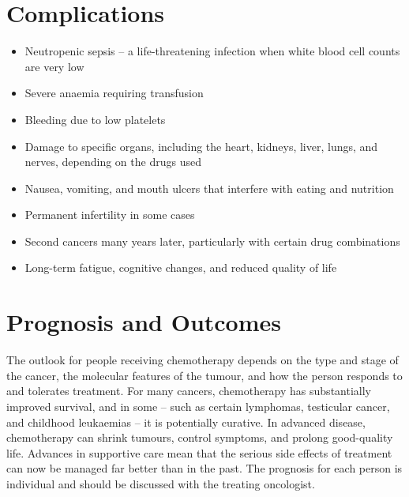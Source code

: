 \section*{Complications}
\begin{itemize}
    \item Neutropenic sepsis -- a life-threatening infection when white blood cell counts are very low
    \item Severe anaemia requiring transfusion
    \item Bleeding due to low platelets
    \item Damage to specific organs, including the heart, kidneys, liver, lungs, and nerves, depending on the drugs used
    \item Nausea, vomiting, and mouth ulcers that interfere with eating and nutrition
    \item Permanent infertility in some cases
    \item Second cancers many years later, particularly with certain drug combinations
    \item Long-term fatigue, cognitive changes, and reduced quality of life
\end{itemize}

\section*{Prognosis and Outcomes}
The outlook for people receiving chemotherapy depends on the type and stage of the cancer, the molecular features of the tumour, and how the person responds to and tolerates treatment. For many cancers, chemotherapy has substantially improved survival, and in some -- such as certain lymphomas, testicular cancer, and childhood leukaemias -- it is potentially curative. In advanced disease, chemotherapy can shrink tumours, control symptoms, and prolong good-quality life. Advances in supportive care mean that the serious side effects of treatment can now be managed far better than in the past. The prognosis for each person is individual and should be discussed with the treating oncologist.

